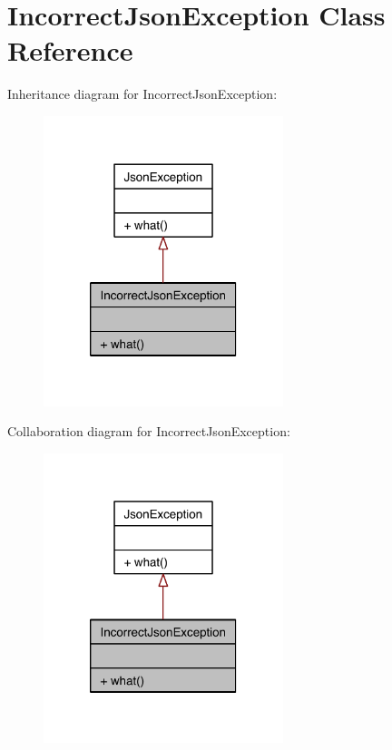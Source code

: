 \hypertarget{class_incorrect_json_exception}{\section{Incorrect\-Json\-Exception Class Reference}
\label{class_incorrect_json_exception}
}


Inheritance diagram for Incorrect\-Json\-Exception\-:\nopagebreak
\begin{figure}[H]
\begin{center}
\leavevmode
\includegraphics[width=198pt]{class_incorrect_json_exception__inherit__graph}
\end{center}
\end{figure}


Collaboration diagram for Incorrect\-Json\-Exception\-:\nopagebreak
\begin{figure}[H]
\begin{center}
\leavevmode
\includegraphics[width=198pt]{class_incorrect_json_exception__coll__graph}
\end{center}
\end{figure}
